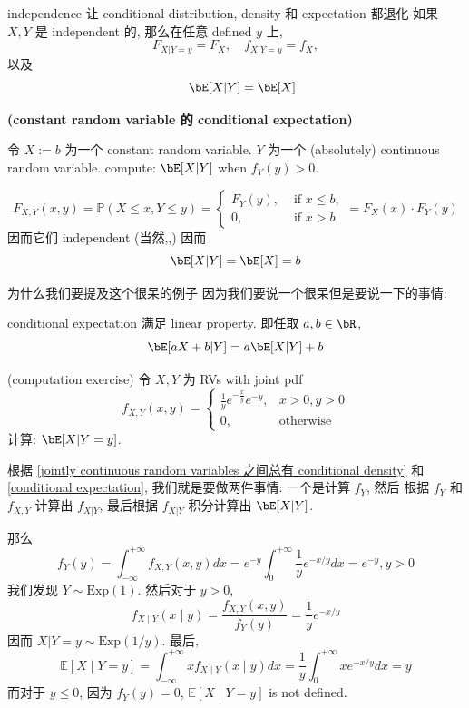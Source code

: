 \begin{proposition}{independence 让 conditional distribution, density 和 expectation 都退化}
    如果 \(X,Y\) 是 independent 的, 那么在任意 defined \(y\) 上, 
    \[
    F_{X|Y=y} = F_X, \quad f_{X|Y=y} = f_X, 
    \]
    以及 \[
    \quad \bE[X|Y] = \bE[X]
    \]
\end{proposition}


\begin{example}\textbf{(constant random variable 的 conditional expectation)}

令 \(X :=b\) 为一个 constant random variable. 
\(Y\) 为一个 (absolutely) continuous random variable.
compute: \(\bE[X|Y]\) when \(f_Y(y) > 0\).

\begin{solution}
    \[
    F_{X, Y}(x, y)=\mathbb{P}(X \leq x, Y \leq y)=\left\{\begin{array}{ll}
F_Y(y), & \text { if } x \leq b, \\
0, & \text { if } x>b
\end{array}=F_X(x) \cdot F_Y(y)\right.
\]
因而它们 independent (当然,,)
因而 \[
\bE[X|Y] = \bE[X] = b
\]
\end{solution}
为什么我们要提及这个很呆的例子
因为我们要说一个很呆但是要说一下的事情: 
\begin{proposition}
conditional expectation 满足 linear property.
即任取 \(a,b\in\bR\), \[
\bE[aX + b|Y] = a\bE[X|Y] + b
\]
\end{proposition} 
\end{example}

\begin{example}
    (computation exercise)
    令 \(X,Y\) 为 RVs with joint pdf \[
    f_{X, Y}(x, y)= \begin{cases}\frac{1}{y} e^{-\frac{x}{y}} e^{-y}, & x>0, y>0 \\ 0, & \text{otherwise}\end{cases}
    \]
    计算: \(\bE[X|Y=y]\).

    \begin{solution}
        根据 \ref{jointly continuous random variables 之间总有 conditional density} 和 
        \ref{conditional expectation}, 我们就是要做两件事情: 一个是计算 \(f_Y\), 然后
        根据 \(f_Y\) 和 \(f_{X,Y}\) 计算出 \(f_{X|Y}\), 
        最后根据 \(f_{X|Y}\) 积分计算出 \(\bE[X|Y]\).

        那么 \[
        f_Y(y)=\int_{-\infty}^{+\infty} f_{X, Y}(x, y) d x=e^{-y} \int_0^{+\infty} \frac{1}{y} e^{-x / y} d x=e^{-y}, y>0
        \]
        我们发现 \(Y \sim \text{Exp}(1)\). 然后对于 \(y>0\), \[
        f_{X \mid Y}(x \mid y)=\frac{f_{X, Y}(x, y)}{f_Y(y)}=\frac{1}{y} e^{-x / y}
        \]
        因而 \(X|Y = y \sim \text{Exp}(1/y)\).
        最后, \[
        \mathbb{E}[X \mid Y=y]=\int_{-\infty}^{+\infty} x f_{X \mid Y}(x \mid y) d x=\frac{1}{y} \int_0^{+\infty} x e^{-x / y} d x=y
        \]
        而对于 \(y \leq 0\), 因为 \(f_Y(y) = 0\), $\mathbb{E}[X \mid Y=y]$ is not defined.
    \end{solution}
\end{example}


